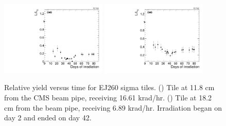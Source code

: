 \begin{figure}[tbp!]
\centering
\includegraphics[width=0.45\textwidth]{figures/EJ260-S-11p8cm-f8ch2-time.pdf}
\includegraphics[width=0.45\textwidth]{figures/EJ260-S-18p2cm-f3ch1-time.pdf}
\caption{Relative yield versus time for EJ260 sigma tiles. (\cmsLeft) Tile at 11.8 cm from the CMS beam pipe, receiving 16.61 krad/hr. (\cmsRight) Tile at 18.2 cm from the beam pipe, receiving 6.89 krad/hr. Irradiation began on day 2 and ended on day 42.}
\label{fig:EJ260-S-time}
\end{figure} 

